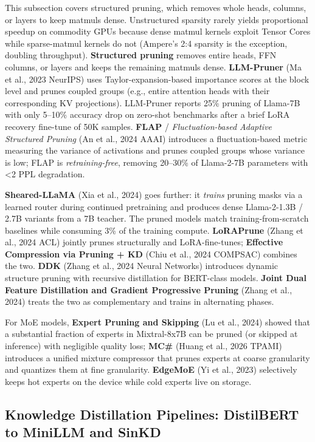 This subsection covers structured pruning, which removes whole heads, columns, or layers to keep matmuls dense. Unstructured sparsity rarely yields proportional speedup on commodity GPUs because dense matmul kernels exploit Tensor Cores while sparse-matmul kernels do not (Ampere's 2:4 sparsity is the exception, doubling throughput). \textbf{Structured pruning} removes entire heads, FFN columns, or layers and keeps the remaining matmuls dense. \textbf{LLM-Pruner} (Ma et al., 2023 NeurIPS) uses Taylor-expansion-based importance scores at the block level and prunes coupled groups (e.g., entire attention heads with their corresponding KV projections). LLM-Pruner reports 25\% pruning of Llama-7B with only 5--10\% accuracy drop on zero-shot benchmarks after a brief LoRA recovery fine-tune of 50K samples. \textbf{FLAP} / \emph{Fluctuation-based Adaptive Structured Pruning} (An et al., 2024 AAAI) introduces a fluctuation-based metric measuring the variance of activations and prunes coupled groups whose variance is low; FLAP is \emph{retraining-free}, removing 20--30\% of Llama-2-7B parameters with \textless2 PPL degradation.

\textbf{Sheared-LLaMA} (Xia et al., 2024) goes further: it \emph{trains} pruning masks via a learned router during continued pretraining and produces dense Llama-2-1.3B / 2.7B variants from a 7B teacher. The pruned models match training-from-scratch baselines while consuming 3\% of the training compute. \textbf{LoRAPrune} (Zhang et al., 2024 ACL) jointly prunes structurally and LoRA-fine-tunes; \textbf{Effective Compression via Pruning + KD} (Chiu et al., 2024 COMPSAC) combines the two. \textbf{DDK} (Zhang et al., 2024 Neural Networks) introduces dynamic structure pruning with recursive distillation for BERT-class models. \textbf{Joint Dual Feature Distillation and Gradient Progressive Pruning} (Zhang et al., 2024) treats the two as complementary and trains in alternating phases.

For MoE models, \textbf{Expert Pruning and Skipping} (Lu et al., 2024) showed that a substantial fraction of experts in Mixtral-8x7B can be pruned (or skipped at inference) with negligible quality loss; \textbf{MC\#} (Huang et al., 2026 TPAMI) introduces a unified mixture compressor that prunes experts at coarse granularity and quantizes them at fine granularity. \textbf{EdgeMoE} (Yi et al., 2023) selectively keeps hot experts on the device while cold experts live on storage.

\subsection{Knowledge Distillation Pipelines: DistilBERT to MiniLLM and SinKD}\label{knowledge-distillation-pipelines-distilbert-to-minillm-and-sinkd}

